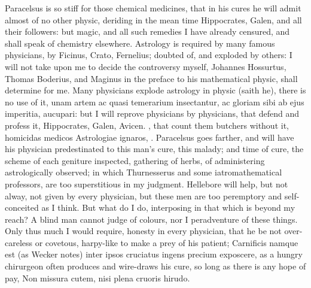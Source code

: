 {Paracelsus is so stiff for those chemical medicines, that in his
cures he will admit almost of no other physic, deriding in the mean
time Hippocrates, Galen, and all their followers: but magic, and all
such remedies I have already censured, and shall speak of chemistry
elsewhere. Astrology is required by many famous physicians, by
Ficinus, Crato, Fernelius; doubted of, and exploded by others: I
will not take upon me to decide the controversy myself, Johannes
Hossurtus, Thomas Boderius, and Maginus in the preface to his
mathematical physic, shall determine for me. Many physicians explode
astrology in physic (saith he), there is no use of it, unam artem ac
quasi temerarium insectantur, ac gloriam sibi ab ejus imperitia,
aucupari: but I will reprove physicians by physicians, that defend and
profess it, Hippocrates, Galen, Avicen. \etc{}, that count them butchers
without it, homicidas medicos Astrologiae ignaros, \etc{}. Paracelsus goes
farther, and will have his physician predestinated to this man's
cure, this malady; and time of cure, the scheme of each geniture
inspected, gathering of herbs, of administering astrologically
observed; in which Thurnesserus and some iatromathematical professors,
are too superstitious in my judgment. Hellebore will help, but
not alway, not given by every physician, \etc{} but these men are too
peremptory and self-conceited as I think. But what do I do, interposing
in that which is beyond my reach? A blind man cannot judge of colours,
nor I peradventure of these things. Only thus much I would require,
honesty in every physician, that he be not over-careless or covetous,
harpy-like to make a prey of his patient; Carnificis namque est (as
Wecker notes) inter ipsos cruciatus ingens precium exposcere, as
a hungry chirurgeon often produces and wire-draws his cure, so long as
there is any hope of pay, Non missura cutem, nisi plena cruoris hirudo.

}
